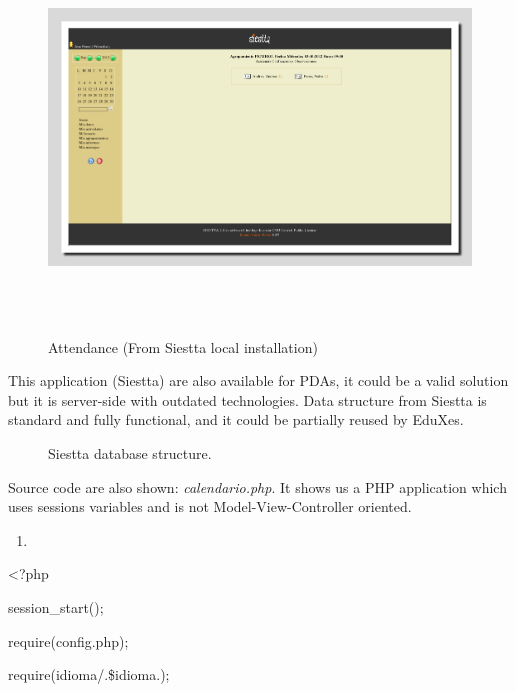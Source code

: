 \documentclass[a4paper]{article}
\begin{document}
\begin{figure}
\centering
\includegraphics[width=17cm,height=10.373cm]{PhoneGapProjectMSWLMemory-img/PhoneGapProjectMSWLMemory-img4.png}
\caption[Attendance (From Siestta local installation)]{Attendance (From
Siestta local installation)}

\end{figure}
This application (Siestta) are also available for PDAs, it could be a
valid solution but it is server-side with outdated technologies. Data
structure from Siestta is standard and fully functional, and it could
be partially reused by EduXes.

\begin{figure}
\caption[Siestta database structure.]{Siestta database structure.}

\end{figure}
Source code are also shown: \textit{calendario.php}. It shows us a PHP
application which uses sessions variables and is not
Model-View-Controller oriented.

\begin{enumerate}
\item[] 
\bigskip
\end{enumerate}
{\textless}?php 

session\_start(); 

require({\textquotesingle}config.php{\textquotesingle}); 

require({\textquotesingle}idioma/{\textquotesingle}.\$idioma.{\textquotesingle}{\textquotesingle});
\end{document}
